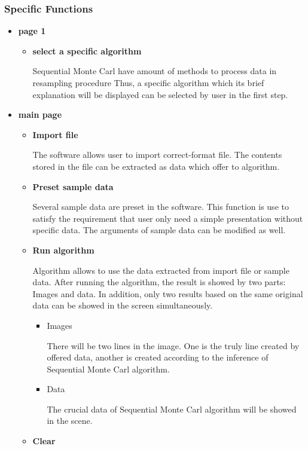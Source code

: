 \documentclass{article}
\begin{document}
    \subsubsection{Specific Functions}
       \begin{itemize}
       \item\textbf{page 1}
        \begin{itemize}
          \item \textbf{select a specific algorithm}

          Sequential Monte Carl have amount of methods to process data in resampling procedure %
          Thus, a specific algorithm which its brief explanation will be displayed can be selected by user in the first step.  
      \end{itemize}
      \item\textbf{main page}
      \begin{itemize}
          \item \textbf{Import file}

          The software allows user to import correct-format file. The contents stored in the file can be extracted as data which offer to algorithm.
          \item \textbf{Preset sample data}

          Several sample data are preset in the software. This function is use to satisfy the requirement that user only need a simple presentation without specific data. The arguments of sample data can be modified as well.
          \item \textbf{Run algorithm}
          
          Algorithm allows to use the data extracted from import file or sample data. After running the algorithm, the result is showed by two parts: Images and data. In addition, only two results based on the same original data can be showed in the screen simultaneously.
          \begin{itemize}
            \item Images

            There will be two lines in the image. One is the truly line created by offered data, another is created according to the inference of Sequential Monte Carl algorithm.%
            \item Data

            The crucial data of Sequential Monte Carl algorithm will be showed in the scene.%
          \end{itemize}
          \item \textbf{Clear}


\end{itemize}
\end{itemize}
\end{document}
